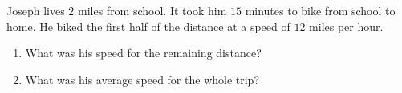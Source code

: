 Joseph lives $2$ miles from school. It took him $15$ minutes to bike from school to home. He biked the first half of the distance at a speed of $12$ miles per hour.
\begin{enumerate}
\item[(a)] What was his speed for the remaining distance?
\item[(b)] What was his average speed for the whole trip?
\end{enumerate}
